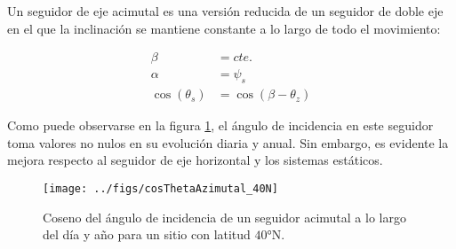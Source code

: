 Un seguidor de eje acimutal es una versión reducida de un seguidor
de doble eje en el que la inclinación se mantiene constante a lo largo
de todo el movimiento:

\begin{align}
\beta & =cte.\\
\alpha & =\psi_{s}\\
\cos(\theta_{s}) & =\cos\left(\beta-\theta_{z}\right)\end{align}


Como puede observarse en la figura \ref{fig:cosThetaAlfa}, el ángulo
de incidencia en este seguidor toma valores no nulos en su evolución
diaria y anual. Sin embargo, es evidente la mejora respecto al seguidor
de eje horizontal y los sistemas estáticos. 

%
\begin{figure}
\texttt{[image: ../figs/cosThetaAzimutal\_40N]}

\caption{Coseno del ángulo de incidencia de un seguidor acimutal a lo largo
del día y año para un sitio con latitud $\ang{40}\mathrm{N}$.\label{fig:cosThetaAlfa}}

\end{figure}

